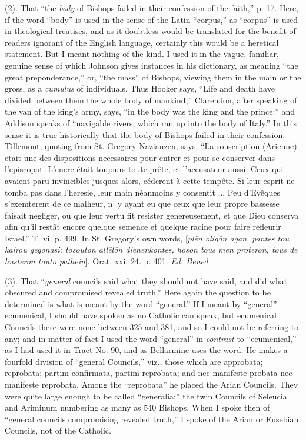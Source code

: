 (2). That ``the \emph{body} of Bishops failed in their
confession of the faith,'' p. 17. Here, if the word
``body'' is used in the sense of the Latin ``corpus,''
as ``corpus'' is used in theological treatises, and as it
doubtless would be translated for the benefit of readers ignorant of
the English language, certainly this would be a heretical statement.
But I meant nothing of the kind. I used it in the vague, familiar,
genuine sense of which Johnson gives instances in his dictionary, as
meaning ``the great preponderance,'' or, ``the mass''
of Bishops, viewing them in the main or the gross, as a \emph{cumulus} of
individuals. Thus Hooker says, ``Life and death have divided
between them the whole body of mankind;'' Clarendon, after
speaking of the van of the king's army, says, ``in the body was
the king and the prince:'' and Addison speaks of
``navigable rivers, which ran up into the body of Italy.'' In
this sense it is true historically that the body of Bishops failed in
their confession. Tillemont, quoting from St. Gregory Nazianzen, says,
``La souscription (Arienne) etait une des dispositions necessaires
pour entrer et pour se conserver dans l'episcopat. L'encre était
toujours toute prête, et l'accusateur aussi. Ceux qui avaient paru
invincibles jusques alors, céderent à cette tempête. Si leur esprit
ne tomba pas dans l'heresie, leur main néanmoins y consentit ... Peu
d'Evêques s'exemterent de ce malheur, n' y ayant eu que ceux que leur
propre bassesse faisait negliger, ou que leur vertu fit resister
genereusement, et que Dieu conserva afin qu'il restât encore quelque
semence et quelque racine pour faire refleurir Israel.'' T. vi. p.
499. In St. Gregory's own words, [\emph{pl\={e}n olig\={o}n agan,
pantes tou kairou gegonasi; tosouton all\={e}l\={o}n
dienenkontes, hoson tous men proteron, tous de husteron touto pathein}].
Orat. xxi. 24. p. 401. \emph{Ed. Bened}.

(3). That ``\emph{general} councils said what they should not
have said, and did what obscured and compromised revealed truth.''
Here again the question to be determined is what is meant by the word
``general.'' If I meant by ``general'' ecumenical, I
should have spoken as no Catholic can speak; but ecumenical Councils
there were none between 325 and 381, and so I could not be referring
to any; and in matter of fact I used the word ``general'' in \emph{contrast}
to ``ecumenical,'' as I had used it in Tract No. 90, and as
Bellarmine uses the word. He makes a fourfold division of
``general Councils,'' viz., those which are approbata;
reprobata; partim confirmata, partim reprobata; and nec manifeste
probata nec manifeste reprobata. Among the ``reprobata'' he
placed the Arian Councils. They were quite large enough to be called
``generalia;'' the twin Councils of Seleucia and Ariminum
numbering as many as 540 Bishops. When I spoke then of ``general
councils compromising revealed truth,'' I spoke of the Arian or
Eusebian Councils, not of the Catholic.

